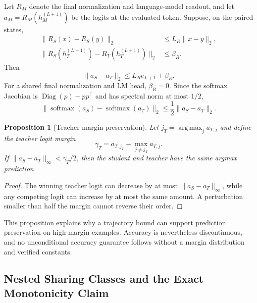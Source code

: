 \documentclass{article}
\newcommand{\Diag}{\operatorname{Diag}}
\theoremstyle{plain}
\newtheorem{proposition}[theorem]{Proposition}
\theoremstyle{definition}
\theoremstyle{remark}
\begin{document}
Let $R_M$ denote the final normalization and language-model readout, and let
$a_M=R_M(h_M^{(L+1)})$ be the logits at the evaluated token.  Suppose, on the
paired states,
\begin{equation}
\begin{aligned}
  \|R_S(x)-R_S(y)\|_2&\le L_R\|x-y\|_2,\\
  \|R_S(h_T^{(L+1)})-R_T(h_T^{(L+1)})\|_2&\le\beta_R.
  \label{eq:app-readout-assumption}
\end{aligned}
\end{equation}
Then
\begin{equation}
  \|a_S-a_T\|_2\le L_R e_{L+1}+\beta_R.
  \label{eq:app-logit-bound}
\end{equation}
For a shared final normalization and LM head, $\beta_R=0$.  Since the softmax
Jacobian is $\Diag(p)-pp^\top$ and has spectral norm at most $1/2$,
\begin{equation}
  \|\operatorname{softmax}(a_S)-\operatorname{softmax}(a_T)\|_2
  \le\frac12\|a_S-a_T\|_2.
  \label{eq:app-softmax-bound}
\end{equation}

\begin{proposition}[Teacher-margin preservation]
\label{prop:app-margin-preservation}
Let $j_T=\operatorname{arg\,max}_j a_{T,j}$ and define the teacher logit margin
\begin{equation}
  \gamma_T=a_{T,j_T}-\max_{j\ne j_T}a_{T,j}.
  \label{eq:app-teacher-margin}
\end{equation}
If $\|a_S-a_T\|_\infty<\gamma_T/2$, then the student and teacher have the same
argmax prediction.
\end{proposition}

\begin{proof}
The winning teacher logit can decrease by at most $\|a_S-a_T\|_\infty$, while any
competing logit can increase by at most the same amount.  A perturbation smaller
than half the margin cannot reverse their order.
\end{proof}

This proposition explains why a trajectory bound can support prediction
preservation on high-margin examples.  Accuracy is nevertheless discontinuous,
and no unconditional accuracy guarantee follows without a margin distribution
and verified constants.

\subsection{Nested Sharing Classes and the Exact Monotonicity Claim}
\label{app:nested-theory}
\end{document}
